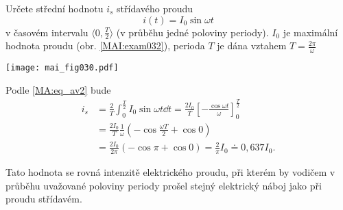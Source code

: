 \wikitextrule
\begin{example}\label{MAI:exam032}
Určete střední hodnotu $i_s$ střídavého proudu $$i(t) = I_0\sin\omega t$$ v
    časovém intervalu $\langle 0, \frac{T}{2}\rangle$ (v průběhu jedné poloviny periody). $I_0$ je
    maximální hodnota proudu (obr. \ref{MAI:exam032}), perioda $T$ je dána vztahem $T =
    \frac{2\pi}{\omega}$
  
  {\centering
   \captionsetup{type=figure}
   \texttt{[image: mai\_fig030.pdf]}
  \par}

    Podle \ref{MA:eq_av2} bude
    \begin{align*}
     i_s &=  \frac{2}{T}
             \int_0^{\frac{T}{2}}I_0\sin\omega t\dd{t} =
             \frac{2I_0}{T}\left[-\frac{\cos\omega t}{\omega}\right]_0^{\frac{T}{2}}        \\
         &=  \frac{2I_0}{T}\frac{1}{\omega}\left(-\cos\frac{\omega T}{2}+ \cos 0\right)     \\
         &=  \frac{2I_0}{2\pi}(-\cos\pi + \cos 0) = \frac{2}{\pi}I_0 \doteq 0,637 I_0.
  \end{align*}

  Tato hodnota se rovná intenzitě elektrického proudu, při kterém by vodičem v průběhu uvažované
  poloviny periody prošel stejný elektrický náboj jako při proudu střídavém.
\end{example}















